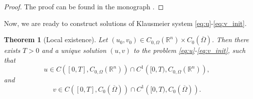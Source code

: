 \documentclass[12pt, a4paper]{article}
\theoremstyle{break}
\newtheorem{thm}{Theorem}[section]
\theoremstyle{break}
\theoremstyle{break}
\theoremstyle{break}
\theoremstyle{break}
\theoremstyle{break}
\theoremstyle{break}
\begin{document}
\begin{proof}
    The proof can be found in the monograph \cite[Theorem 6.1.8]{Arendt2001}.
\end{proof}
Now, we are ready to construct solutions of Klausmeier system \eqref{eq:u}-\eqref{eq:v_init}.
\begin{thm}[Local existence]
    \label{thm:Well-Posedness}
    Let $(u_0, v_0) \in C_{0, \Omega}(\mathbb{R}^n) \times C_0(\overline{\Omega})$. Then there exists $T > 0$ and a unique solution $(u, v)$ to the problem \eqref{eq:u}-\eqref{eq:v_init}, such that
    \begin{equation}
        u \in C\left([0, T], C_{0, \Omega}(\mathbb{R}^n)\right) \cap C^1\left([0, T), C_{0, \Omega}(\mathbb{R}^n)\right),
    \end{equation}
    and
    \begin{equation}
        v \in C\left([0, T], C_0(\overline{\Omega})\right) \cap C^1\left([0, T), C_0(\overline{\Omega})\right).
    \end{equation}
\end{thm}
\end{document}
